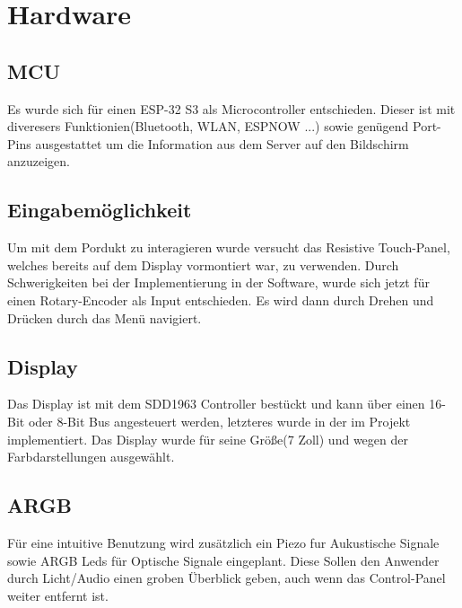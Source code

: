 \section{Hardware}


    \subsection{MCU}
    Es wurde sich für einen ESP-32 S3 als Microcontroller entschieden.
    Dieser ist mit diveresers Funktionien(Bluetooth, WLAN, ESPNOW ...) 
    sowie genügend Port-Pins ausgestattet um die Information aus dem 
    Server auf den Bildschirm anzuzeigen.

    \subsection{Eingabemöglichkeit}
    Um mit dem Pordukt zu interagieren wurde versucht das Resistive Touch-Panel,
    welches bereits auf dem Display vormontiert war, zu verwenden. Durch Schwerigkeiten 
    bei der Implementierung in der Software, wurde sich jetzt für einen Rotary-Encoder 
    als Input entschieden. Es wird dann durch Drehen und Drücken durch das Menü navigiert.

    \subsection{Display}
    Das Display ist mit dem SDD1963 Controller bestückt und kann über 
    einen 16-Bit oder 8-Bit Bus angesteuert werden, letzteres wurde in der 
    im Projekt implementiert. Das Display wurde für seine Größe(7 Zoll) und wegen der Farbdarstellungen ausgewählt.

    \subsection{ARGB}
    Für eine intuitive Benutzung wird zusätzlich ein Piezo fur Aukustische Signale 
    sowie ARGB Leds für Optische Signale eingeplant. Diese Sollen den Anwender durch 
    Licht/Audio einen groben Überblick geben, auch wenn das Control-Panel weiter entfernt ist.